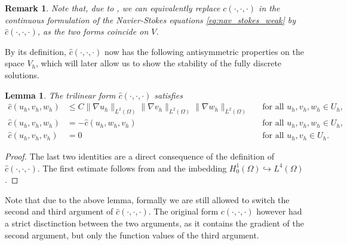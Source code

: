 \documentclass{m2an}
\newtheorem{lemma}[theorem]{Lemma}
\newtheorem{remark}[theorem]{Remark}
\newcommand{\chatO}[1]{\hat c\left( #1 \right)}
\newcommand{\cO}[1]{c\left( #1 \right)}
\begin{document}
\begin{remark}
  Note that, due to , we can equivalently replace $c(\cdot,\cdot,\cdot)$
  in the continuous formulation of the Navier-Stokes equations \eqref{eq:nav_stokes_weak} by
  $\hat c(\cdot,\cdot,\cdot)$, as the two forms coincide on $V$.
\end{remark}
By its definition, $\chatO{\cdot,\cdot,\cdot}$ now has the following antisymmetric
properties on the space $V_h$, which will later allow us to show the stability of the 
fully discrete solutions.
\begin{lemma}\label{lemm:chat}
  The trilinear form $\chatO{\cdot,\cdot,\cdot}$ satisfies
  \begin{align*}
    \chatO{u_h,v_h,w_h} & \le C\|\nabla u_h\|_{L^2(\Omega)} \|\nabla v_h\|_{L^2(\Omega)} 
    \|\nabla w_h\|_{L^2(\Omega)} && \text{for all } u_h, v_h, w_h \in U_h,\\
    \chatO{u_h, v_h, w_h} &= - \chatO{u_h,w_h,v_h} && \text{for all } u_h, v_h, w_h \in U_h,\\
    \chatO{u_h, v_h, v_h} &= 0 && \text{for all } u_h, v_h \in U_h.
  \end{align*}
\end{lemma}
\begin{proof}
  The last two identities are a direct consequence of the definition of $\chatO{\cdot,\cdot,\cdot}$.
  The first estimate follows from  and the imbedding 
  $H^1_0(\Omega) \hookrightarrow L^4(\Omega)$.
\end{proof}
Note that due to the above lemma,
formally we are still allowed to switch the second and third argument of $\chatO{\cdot,\cdot,\cdot}$.
The original form $\cO{\cdot,\cdot,\cdot}$ however had a strict disctinction between the two arguments, as it contains
the gradient of the second argument, but only the function values of the third argument.
\end{document}
